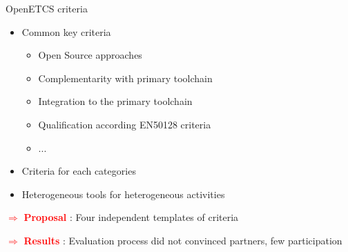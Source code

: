 \begin{frame}{OpenETCS criteria}

  \begin{itemize}
  \item 
    Common key criteria
      \begin{itemize}
 	  \item
 	   Open Source approaches
 	  \item
 	   Complementarity with primary toolchain
 	  \item
 	   Integration to  the primary toolchain
 	  \item 
 	   Qualification according EN50128 criteria
 	   \item
		...
	  \end{itemize}
	       \pause

	 \item
	 Criteria for each categories
	 \item
	 Heterogeneous tools for heterogeneous activities
  
  \end{itemize}
  

\pause   
   
  \textcolor{red}{$ \Rightarrow $ \bf{Proposal} } :
   Four independent templates of criteria


\pause   
   
  \textcolor{red}{$ \Rightarrow $ \bf{Results} } :
   Evaluation process did not convinced partners, few participation
   
\end{frame}

